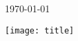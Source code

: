 \documentclass[12pt,a4paper,final]{article}
\begin{document}
\begin{titlepage}
	
	
	\vfill\vfill\vfill %
	
	{\large\today} %
	
	
	\vfill\vfill
	\graphicspath{{./figures/}}
	\texttt{[image: title]}\\[1cm] %
	 
	
	\vfill %
	
\end{titlepage}

\clearpage
\end{document}
